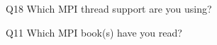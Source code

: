 \begin{description}%
\item{Q18} Which MPI thread support are you using?%
\item{Q11} Which MPI book(s) have you read?%
\end{description}%
